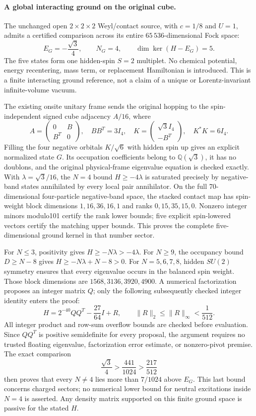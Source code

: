 \paragraph{A global interacting ground on the original cube.}
The unchanged open $2\times2\times2$ Weyl/contact source, with
$c=1/8$ and $U=1$, admits a certified comparison across its entire
$65\,536$-dimensional Fock space:
\[
 E_G=-\frac{\sqrt3}{4},\qquad N_G=4,
 \qquad \dim\ker(H-E_G)=5.
\]
The five states form one hidden-spin $S=2$ multiplet. No chemical
potential, energy recentering, mass term, or replacement Hamiltonian is
introduced. This is a finite interacting ground reference, not a claim
of a unique or Lorentz-invariant infinite-volume vacuum.

The existing onsite unitary frame sends the original hopping to the
spin-independent signed cube adjacency $A/16$, where
\[
 A=\begin{pmatrix}0&B\\B^T&0\end{pmatrix},\quad BB^T=3I_4,
 \quad K=\begin{pmatrix}\sqrt3 I_4\\-B^T\end{pmatrix},
 \quad K^*K=6I_4.
\]
Filling the four negative orbitals $K/\sqrt6$ with hidden spin up gives
an explicit normalized state $G$. Its occupation coefficients belong
to $\mathbb Q(\sqrt3)$, it has no doublons, and the original physical-frame
eigenvalue equation is checked exactly. With $\lambda=\sqrt3/16$, the
$N=4$ bound $H\geq-4\lambda$ is saturated precisely by negative-band
states annihilated by every local pair annihilator. On the full
70-dimensional four-particle negative-band space, the stacked contact
map has spin-weight block dimensions $1,16,36,16,1$ and ranks
$0,15,35,15,0$. Nonzero integer minors modulo101 certify the rank lower
bounds; five explicit spin-lowered vectors certify the matching upper
bounds. This proves the complete five-dimensional ground kernel in
that number sector.

For $N\leq3$, positivity gives $H\geq-N\lambda>-4\lambda$.
For $N\geq9$, the occupancy bound $D\geq N-8$ gives
$H\geq-N\lambda+N-8>0$.
For $N=5,6,7,8$, hidden $SU(2)$ symmetry ensures that every eigenvalue
occurs in the balanced spin weight. Those block dimensions are
$1568,3136,3920,4900$. A numerical factorization proposes an integer
matrix $Q$; only the following subsequently checked integer identity
enters the proof:
\[
 H=2^{-40}QQ^T-\frac{27}{64}I+R,
 \qquad \|R\|_2\leq\|R\|_\infty<\frac1{512}.
\]
All integer product and row-sum overflow bounds are checked before
evaluation. Since $QQ^T$ is positive semidefinite for every proposal,
the argument requires no trusted floating eigenvalue, factorization
error estimate, or nonzero-pivot premise. The exact comparison
\[
 \frac{\sqrt3}{4}>\frac{441}{1024}>\frac{217}{512}
\]
then proves that every $N\ne4$ lies more than $7/1024$ above $E_G$.
This last bound concerns charged sectors; no numerical lower bound
for neutral excitations inside $N=4$ is asserted. Any density matrix
supported on this finite ground space is passive for the stated $H$.

